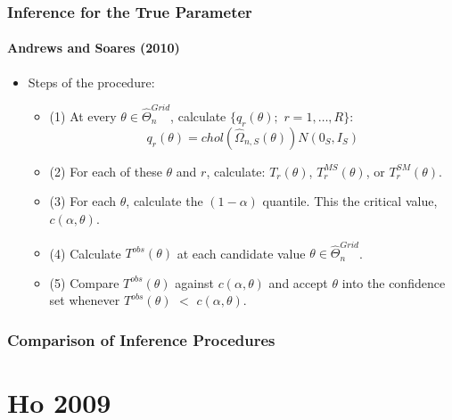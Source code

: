 \begin{frame}
\frametitle{Inference for the True Parameter}
\framesubtitle{Andrews and Soares (2010)}

\begin{itemize}
\item Steps of the procedure: 

\begin{itemize}
\item (1) At every $\theta \in \widehat{\Theta }_{n}^{Grid}$, calculate $%
\{q_{r}(\theta );$ $r=1,\dots ,R\}$: 
\begin{equation*}
q_{r}(\theta )=chol(\widehat{\Omega }_{n,S}(\theta ))N(0_{S},I_{S})
\end{equation*}

\item (2) For each of these $\theta $ and $r$, calculate: $T_{r}(\theta )$, $%
T_{r}^{MS}(\theta )$, or $T_{r}^{SM}(\theta )$. 

\item (3) For each $\theta $, calculate the $(1-\alpha )$ quantile. This the
critical value, $c(\alpha ,\theta )$. 

\item (4) Calculate $T^{obs}(\theta )$ at each candidate value $\theta \in 
\widehat{\Theta }_{n}^{Grid}$. 

\item (5) Compare $T^{obs}(\theta )$ against $c(\alpha ,\theta )$ and accept 
$\theta $ into the confidence set whenever $T^{obs}(\theta )$ $<$ $c(\alpha
,\theta )$. 
\end{itemize}
\end{itemize}
\end{frame}


\begin{frame}
\frametitle{Comparison of Inference Procedures}

\begin{figure}[h!]
\begin{center}
\end{center}
\end{figure}
\end{frame}


\section{Ho 2009}

